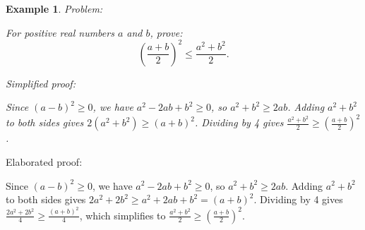 \documentclass{article}
\newtheorem{example}{Example}
\begin{document}
\begin{example}
Problem:
\begin{tcolorbox}[colback=yellow!10, width=\linewidth]
For positive real numbers $a$ and $b$, prove:
    $$\left(\frac{a+b}{2}\right)^2 \leq \frac{a^2+b^2}{2}.$$
\end{tcolorbox}

Simplified proof:
\begin{tcolorbox}[colback=blue!10, width=\linewidth]
Since $(a-b)^2 \ge 0$, we have $a^2 - 2ab + b^2 \ge 0$, so $a^2 + b^2 \ge 2ab$.  Adding $a^2 + b^2$ to both sides gives $2(a^2+b^2) \ge (a+b)^2$. Dividing by 4 gives $\frac{a^2+b^2}{2} \ge \left(\frac{a+b}{2}\right)^2$.
\end{tcolorbox}
\end{example}

Elaborated proof:
\begin{tcolorbox}[colback=green!10, width=\linewidth]
Since $(a-b)^2 \ge 0$, we have $a^2 - 2ab + b^2 \ge 0$, so $a^2 + b^2 \ge 2ab$.  Adding $a^2 + b^2$ to both sides gives $2a^2 + 2b^2 \ge a^2 + 2ab + b^2 = (a+b)^2$. Dividing by 4 gives $\frac{2a^2 + 2b^2}{4} \ge \frac{(a+b)^2}{4}$, which simplifies to $\frac{a^2+b^2}{2} \ge \left(\frac{a+b}{2}\right)^2$.
\end{tcolorbox}
\end{document}
